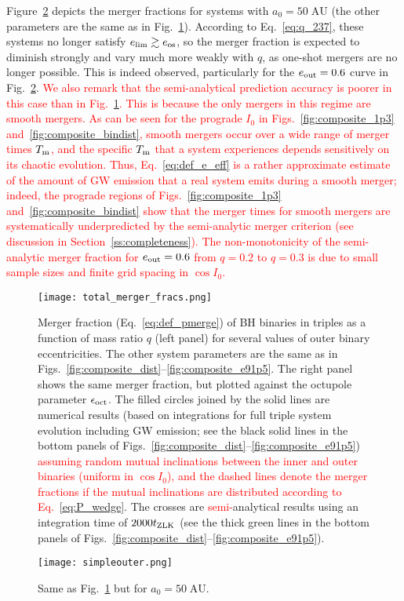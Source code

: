 \documentclass[
        fleqn,
        usenatbib,
    ]{mnras}
\begin{document}
Figure~\ref{fig:sweepbin_simpleouter} depicts the merger fractions for systems
with $a_0 = 50\;\mathrm{AU}$ (the other parameters are the same as in
Fig.~\ref{fig:total_merger_fracs}). According to Eq.~\eqref{eq:q_237}, these
systems no longer satisfy $e_{\lim} \gtrsim e_{\rm os}$, so the
merger fraction is expected to diminish strongly and vary much more weakly with
$q$, as one-shot mergers are no longer possible. This is indeed observed,
particularly for the $e_{\rm out} = 0.6$ curve in
Fig.~\ref{fig:sweepbin_simpleouter}. \textcolor{red}{We also remark that the
semi-analytical prediction accuracy is poorer in this case than in
Fig.~\ref{fig:total_merger_fracs}. This is because the only mergers in this
regime are smooth mergers. As can be seen for the prograde $I_0$ in
Figs.~\ref{fig:composite_1p3} and~\ref{fig:composite_bindist}, smooth mergers
occur over a wide range of merger times $T_{\rm m}$, and the specific $T_{\rm
m}$ that a system experiences depends sensitively on its chaotic evolution.
Thus, Eq.~\eqref{eq:def_e_eff} is a rather approximate estimate of the amount of
GW emission that a real system emits during a smooth merger; indeed, the
prograde regions of Figs.~\ref{fig:composite_1p3}
and~\ref{fig:composite_bindist} show that the merger times for smooth mergers
are systematically underpredicted by the semi-analytic merger criterion (see
discussion in Section~\ref{ss:completeness}). The non-monotonicity of the
semi-analytic merger fraction for $e_{\rm out} = 0.6$ from $q = 0.2$ to $q =
0.3$ is due to small sample sizes and finite grid spacing in $\cos I_0$.}

\begin{figure*}
    \centering
    \texttt{[image: total\_merger\_fracs.png]}
    \caption{Merger fraction (Eq.~\ref{eq:def_pmerge}) of BH binaries in
    triples as a function of mass ratio $q$ (left panel) for several values of
    outer binary eccentricities. The other system parameters are the same as in
    Figs.~\ref{fig:composite_dist}--\ref{fig:composite_e91p5}. The right panel
    shows the same merger fraction, but plotted against the octupole parameter
    $\epsilon_{\rm oct}$.  The filled circles joined by the solid lines are
    numerical results (based on integrations for full triple system evolution
    including GW emission; see the black solid lines in the bottom panels of
    Figs.~\ref{fig:composite_dist}--\ref{fig:composite_e91p5})
    \textcolor{red}{assuming random mutual inclinations between the inner and
    outer binaries (uniform in $\cos I_0$), and the dashed lines denote the
    merger fractions if the mutual inclinations are distributed according to
    Eq.~\eqref{eq:P_wedge}}. The crosses are \textcolor{red}{semi-}analytical
    results using an integration time of $2000 t_{\rm ZLK}$ (see the thick green
    lines in the bottom panels of
    Figs.~\ref{fig:composite_dist}--\ref{fig:composite_e91p5}).
    }\label{fig:total_merger_fracs}
\end{figure*}
\begin{figure*}
    \centering
    \texttt{[image: simpleouter.png]}
    \caption{Same as Fig.~\ref{fig:total_merger_fracs} but for $a_0 =
    50\;\mathrm{AU}$.}\label{fig:sweepbin_simpleouter}
\end{figure*}
\end{document}
